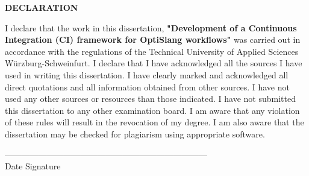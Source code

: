 \vspace*{3cm}
\begin{center}
    \textbf{\Huge DECLARATION}
\end{center}
\vspace{2cm}
\begin{onehalfspace}
    I declare that the work in this dissertation, \textbf{"Development of a Continuous Integration (CI) framework for OptiSlang workflows"} was carried out in accordance
with the regulations of the Technical University of Applied Sciences Würzburg-Schweinfurt. I declare that I have acknowledged all the sources I have used in
writing this dissertation. I have clearly marked and acknowledged all direct quotations and all information obtained from other sources. I have not used any
other sources or resources than those indicated. I have not submitted this dissertation to any other examination board. I am aware that any violation of these
rules will result in the revocation of my degree. I am also aware that the dissertation may be checked for plagiarism using appropriate software.
\end{onehalfspace}

\vspace{1cm}

------------------------------------\hspace{6cm}------------------------------------\\
Date \hspace{12cm} Signature

\vspace*{10cm}


